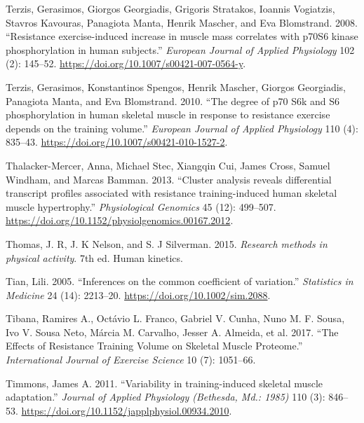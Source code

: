 \documentclass[
  letterpaper,
  DIV=11,
  numbers=noendperiod]{scrreprt}
\newlength{\cslhangindent}
\newlength{\cslentryspacingunit} %
\newenvironment{CSLReferences}[2] %
 {%
  \setlength{\parindent}{0pt}
  \ifodd #1
  \let\oldpar\par
  \def\par{\hangindent=\cslhangindent\oldpar}
  \fi
  \setlength{\parskip}{#2\cslentryspacingunit}
 }%
 {}
\begin{document}
\begin{CSLReferences}{1}{0}
\leavevmode{}%
Terzis, Gerasimos, Giorgos Georgiadis, Grigoris Stratakos, Ioannis
Vogiatzis, Stavros Kavouras, Panagiota Manta, Henrik Mascher, and Eva
Blomstrand. 2008. {``Resistance exercise-induced increase in muscle mass
correlates with p70S6 kinase phosphorylation in human subjects.''}
\emph{European Journal of Applied Physiology} 102 (2): 145--52.
\url{https://doi.org/10.1007/s00421-007-0564-y}.

\leavevmode{}%
Terzis, Gerasimos, Konstantinos Spengos, Henrik Mascher, Giorgos
Georgiadis, Panagiota Manta, and Eva Blomstrand. 2010. {``The degree of
p70 S6k and S6 phosphorylation in human skeletal muscle in response to
resistance exercise depends on the training volume.''} \emph{European
Journal of Applied Physiology} 110 (4): 835--43.
\url{https://doi.org/10.1007/s00421-010-1527-2}.

\leavevmode{}%
Thalacker-Mercer, Anna, Michael Stec, Xiangqin Cui, James Cross, Samuel
Windham, and Marcas Bamman. 2013. {``Cluster analysis reveals
differential transcript profiles associated with resistance
training-induced human skeletal muscle hypertrophy.''}
\emph{Physiological Genomics} 45 (12): 499--507.
\url{https://doi.org/10.1152/physiolgenomics.00167.2012}.

\leavevmode{}%
Thomas, J. R, J. K Nelson, and S. J Silverman. 2015. \emph{Research
methods in physical activity}. 7th ed. Human kinetics.

\leavevmode{}%
Tian, Lili. 2005. {``Inferences on the common coefficient of
variation.''} \emph{Statistics in Medicine} 24 (14): 2213--20.
\url{https://doi.org/10.1002/sim.2088}.

\leavevmode{}%
Tibana, Ramires A., Octávio L. Franco, Gabriel V. Cunha, Nuno M. F.
Sousa, Ivo V. Sousa Neto, Márcia M. Carvalho, Jesser A. Almeida, et al.
2017. {``The Effects of Resistance Training Volume on Skeletal Muscle
Proteome.''} \emph{International Journal of Exercise Science} 10 (7):
1051--66.

\leavevmode{}%
Timmons, James A. 2011. {``Variability in training-induced skeletal
muscle adaptation.''} \emph{Journal of Applied Physiology (Bethesda,
Md.: 1985)} 110 (3): 846--53.
\url{https://doi.org/10.1152/japplphysiol.00934.2010}.


\end{CSLReferences}
\end{document}
